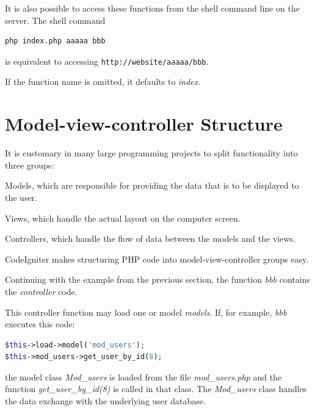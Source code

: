 \documentclass[11pt,oneside,a4paper]{memoir}
\begin{document}
It is also possible to access these functions from the shell command line on the server. The shell command

\begin{lstlisting}[language=bash]
php index.php aaaaa bbb
\end{lstlisting}

\noindent
is equivalent to accessing \texttt{http://website/aaaaa/bbb}.

If the function name is omitted, it defaults to \emph{index}.


\section{Model-view-controller Structure}

It is customary in many large programming projects to split functionality into three groups:

\begin{list}{-}{%
    \setlength{\itemsep}{0pt}%
    \setlength{\parsep}{0pt}%
    \setlength{\topsep}{\baselineskip}%
    \setlength{\partopsep}{0pt}%
  }
  \item Models, which are responsible for providing the data that is to be displayed to the user.
  \item Views, which handle the actual layout on the computer screen.
  \item Controllers, which handle the flow of data between the models and the views.
\end{list}

CodeIgniter makes structuring PHP code into model-view-controller groups easy.

Continuing with the example from the previous section, the function \emph{bbb} contains the
\emph{controller} code.

This controller function may load one or model \emph{models}. If, for example, \emph{bbb}
executes this code:

\begin{lstlisting}[language=PHP]
$this->load->model('mod_users');
$this->mod_users->get_user_by_id(8);
\end{lstlisting}

\noindent
the model class \emph{Mod\_users} is loaded from the file \emph{mod\_users.php} and the function
\emph{get\_\-user\_\-by\_\-id(8)} is called in that class. The \emph{Mod\_users} class handles the data
exchange with the underlying user database.
\end{document}
